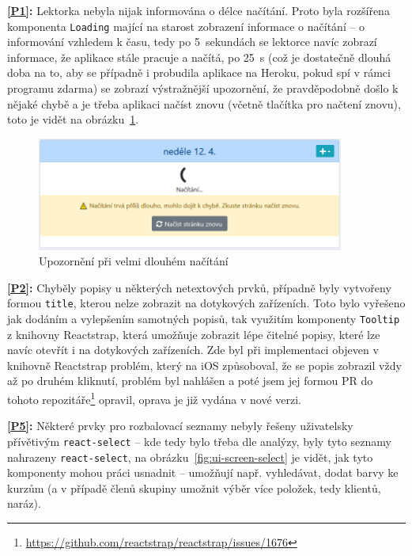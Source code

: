 \textbf{\ref{P1}:} Lektorka nebyla nijak informována o délce načítání. Proto byla rozšířena komponenta \verb|Loading| mající na starost zobrazení informace o načítání -- o informování vzhledem k času, tedy po 5~sekundách se lektorce navíc zobrazí informace, že aplikace stále pracuje a načítá, po 25~s (což je dostatečně dlouhá doba na to, aby se případně i probudila aplikace na Heroku, pokud spí v rámci programu zdarma) se zobrazí výstražnější upozornění, že pravděpodobně došlo k nějaké chybě a je třeba aplikaci načíst znovu (včetně tlačítka pro načtení znovu), toto je vidět na obrázku~\ref{fig:ui-screen-loading}.

\begin{figure}[h]\centering
    \includegraphics[width=0.9\textwidth]{img/ui-screen-loading.png}
    \caption{Upozornění při velmi dlouhém načítání}\label{fig:ui-screen-loading}
\end{figure}

\textbf{\ref{P2}:} Chyběly popisy u některých netextových prvků, případně byly vytvořeny formou \verb|title|, kterou nelze zobrazit na dotykových zařízeních. Toto bylo vyřešeno jak dodáním a vylepšením samotných popisů, tak využitím komponenty \verb|Tooltip| z knihovny Reactstrap, která umožňuje zobrazit lépe čitelné popisy, které lze navíc otevřít i na dotykových zařízeních. Zde byl při implementaci objeven v knihovně Reactstrap problém, který na iOS způsoboval, že se popis zobrazil vždy až po druhém kliknutí, problém byl nahlášen a poté jsem jej formou PR do tohoto repozitáře\footnote{\url{https://github.com/reactstrap/reactstrap/issues/1676}} opravil, oprava je již vydána v nové verzi.

\textbf{\ref{P5}:} Některé prvky pro rozbalovací seznamy nebyly řešeny uživatelsky přívětivým \verb|react-select| -- kde tedy bylo třeba dle analýzy, byly tyto seznamy nahrazeny \verb|react-select|, na obrázku~\ref{fig:ui-screen-select} je vidět, jak tyto komponenty mohou práci usnadnit -- umožňují např. vyhledávat, dodat barvy ke kurzům (a v případě členů skupiny umožnit výběr více položek, tedy klientů, naráz).

